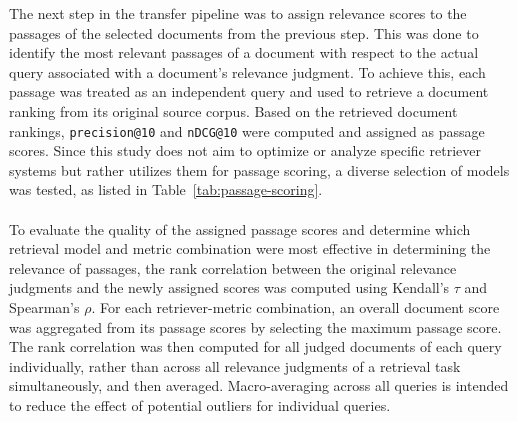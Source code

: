 The next step in the transfer pipeline was to assign relevance scores to the passages of the selected documents from the previous step. This was done to identify the most relevant passages of a document with respect to the actual query associated with a document's relevance judgment. To achieve this, each passage was treated as an independent query and used to retrieve a document ranking from its original source corpus. Based on the retrieved document rankings, \texttt{precision@10} and \texttt{nDCG@10} were computed and assigned as passage scores. Since this study does not aim to optimize or analyze specific retriever systems but rather utilizes them for passage scoring, a diverse selection of models was tested, as listed in Table~\ref{tab:passage-scoring}.
\\\\
To evaluate the quality of the assigned passage scores and determine which retrieval model and metric combination were most effective in determining the relevance of passages, the rank correlation between the original relevance judgments and the newly assigned scores was computed using Kendall's $\tau$ and Spearman's $\rho$. For each retriever-metric combination, an overall document score was aggregated from its passage scores by selecting the maximum passage score. The rank correlation was then computed for all judged \mbox{documents} of each query individually, rather than across all relevance judgments of a retrieval task simultaneously, and then averaged. Macro-averaging across all queries is intended to reduce the effect of potential outliers for individual queries.
